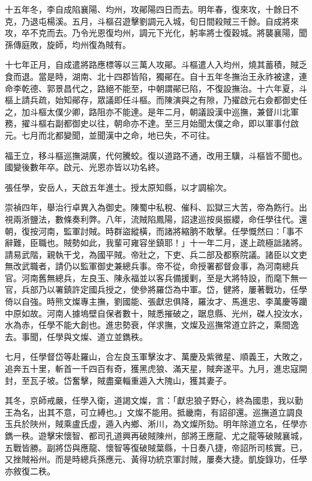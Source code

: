 \begin{pinyinscope}
十五年冬，李自成陷襄陽、均州，攻鄖陽四日而去。明年春，復來攻，十餘日不克，乃退屯楊溪。五月，斗樞召遊擊劉調元入城，旬日間殺賊三千餘。自成將來攻，卒不克而去。乃令光恩復均州，調元下光化，躬率將士復穀城。將襲襄陽，聞孫傳庭敗，旋師，均州復為賊有。

十七年正月，自成遣將路應標等以三萬人攻鄖。斗樞遣人入均州，燒其蓄積，賊乏食而退。當是時，湖南、北十四郡皆陷，獨鄖在。自十五年冬撫治王永祚被逮，連命李乾德、郭景昌代之，路絕不能至，中朝謂鄖已陷，不復設撫治。十六年夏，斗樞上請兵疏，始知鄖存，眾議即任斗樞。而陳演與之有隙，乃擢啟元右僉都御史任之，加斗樞太僕少卿，路阻亦不能達。是年二月，朝議設漢中巡撫，兼督川北軍務，擢斗樞右副都御史以往，朝命亦不達。至三月始聞太僕之命，即以軍事付啟元。七月而北都變聞，並聞漢中之命，地已失，不可往。

福王立，移斗樞巡撫湖廣，代何騰蛟。復以道路不通，改用王驥，斗樞皆不聞也。國變後數年卒。啟元、光恩亦皆以功名終。

張任學，安岳人，天啟五年進士。授太原知縣，以才調榆次。

崇禎四年，舉治行卓異入為御史。陳蜀中私稅、催科、訟獄三大苦，帝為飭行。出視兩浙鹽法，數條奏利弊。八年，流賊陷鳳陽，詔逮巡按吳振纓，命任學往代。還朝，復按河南，監軍討賊。時群盜縱橫，而諸將縮朒不敢擊。任學慨然曰：「事不辭難，臣職也。賊勢如此，我輩可雍容坐鎮耶！」十一年二月，遂上疏極詆諸將。請易武階，親執干戈，為國平賊。帝壯之，下吏、兵二部及都察院議。諸臣以文吏無改武職者，請仍以監軍御史兼總兵事。帝不從，命授署都督僉事，為河南總兵官。河南舊無總兵，左良玉、陳永福並以客兵備援剿，至是大將特設，而麾下無一官，兵部乃以署鎮許定國兵授之，使參將羅岱為中軍。岱，健將，屢著戰功，任學倚以自強。時熊文燦專主撫，劉國能、張獻忠俱降，羅汝才、馬進忠、李萬慶等躪中原如故。河南人據塢壁自保者數十，賊悉摧破之，踞息縣、光州，磔人投汝水，水為赤，任學不能大創也。進忠勢衰，佯求撫，文燦及巡撫常道立許之，乘間逸去。事聞，任學與文燦、道立並鐫秩。

七月，任學督岱等赴羅山，合左良玉軍擊汝才、萬慶及紫微星、順義王，大敗之，追奔五十里，斬首一千四百有奇，獲黑虎狼、滿天星，賊奔遂平。九月，進忠寇開封，至瓦子坡。岱奮擊，賊盡棄輜重遁入大隗山，獲其妻子。

其冬，京師戒嚴，任學入衛，道謁文燦，言：「獻忠狼子野心，終為國患，我以勤王為名，出其不意，可立縛也。」文燦不能用。抵畿南，有詔卻還。巡撫道立調良玉兵於陜州，賊乘盧氏虛，遁入內鄉、淅川，為文燦所劾。明年除道立名，任學亦鐫一秩。遊擊宋懷智、都司孔道興再破賊陳州，部將王應龍、尤之龍等破賊襄城，五戰皆勝。副將岱與應龍、懷智等復破賊葉縣，十日奏八捷，帝詔所司核實。已，又挫賊裕州。而是時總兵孫應元、黃得功統京軍討賊，屢奏大捷。凱旋錄功，任學亦敘復二秩。


\end{pinyinscope}
